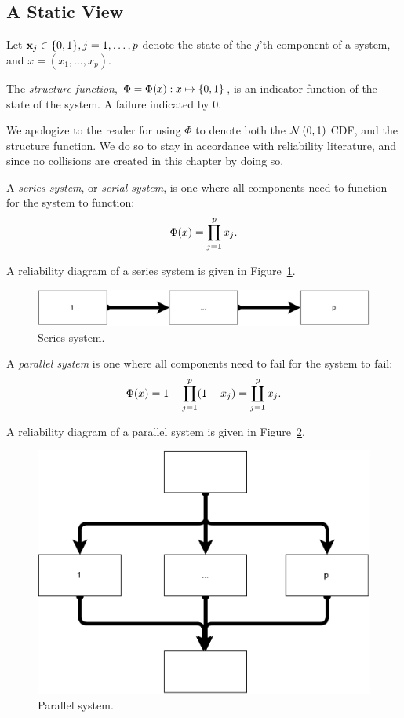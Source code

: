 \subsection{A Static View}

Let $\mathbf{x}_j \in \{ 0,1 \}, j=1,\dots,p$ denote the state of the $j$'th component of a system, and $x=(x_1,\dots,x_p)$.

\begin{definition}
The \emph{structure function}, $\Phi=\Phi(x):x \mapsto \{ 0,1 \}$, is an indicator function of the state of the system. A failure indicated by $0$. 
\end{definition}

\begin{remark}[$\Phi$]
We apologize to the reader for using $\Phi$ to denote both the $\mathcal{N}\left(0,1\right)$ CDF, and the structure function.
We do so to stay in accordance with reliability literature, and since no collisions are created in this chapter by doing so.
\end{remark}

\begin{definition}
A \emph{series system}, or \emph{serial system}, is one where all components need to function for the system to function: $$\Phi(x)=\prod_{j=1}^{p}x_j.$$
\end{definition}
A reliability diagram of a series system is given in Figure~\ref{fig:series_system}.
\begin{figure}[ht]
\centering
\includegraphics[width=0.5\linewidth]{art/series_system}
\caption{Series system.}
\label{fig:series_system}
\end{figure}


\begin{definition}
A \emph{parallel system} is one where all components need to fail for the system to fail:
$$\Phi(x)=1-\prod_{j=1}^{p} (1-x_j)= \coprod_{j=1}^p x_j.$$
\end{definition}
A reliability diagram of a parallel system is given in Figure~\ref{fig:parallel_system}.
\begin{figure}[ht]
\centering
\includegraphics[width=0.5\linewidth]{art/parallel_system}
\caption{Parallel system.}
\label{fig:parallel_system}
\end{figure}





